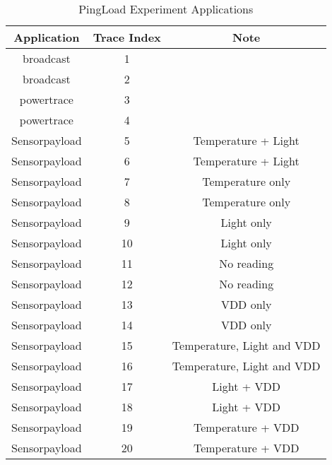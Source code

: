 \begin{table}[!ht]
\center
\begin{tabular}{|c|c|c|}
\hline
\textbf{Application} & \textbf{Trace Index} & \textbf{Note} \\ \hline
broadcast & 1 &  \\ \hline
broadcast & 2 &  \\ \hline
powertrace & 3 &  \\ \hline
powertrace & 4 &  \\ \hline
Sensorpayload & 5 & Temperature + Light \\ \hline
Sensorpayload & 6 & Temperature + Light \\ \hline
Sensorpayload & 7 & Temperature only \\ \hline
Sensorpayload & 8 & Temperature only \\ \hline
Sensorpayload & 9 & Light only \\ \hline
Sensorpayload & 10 & Light only \\ \hline
Sensorpayload & 11 & No reading \\ \hline
Sensorpayload & 12 & No reading \\ \hline
Sensorpayload & 13 & VDD only \\ \hline
Sensorpayload & 14 & VDD only \\ \hline
Sensorpayload & 15 & Temperature, Light and VDD \\ \hline
Sensorpayload & 16 & Temperature, Light and VDD \\ \hline
Sensorpayload & 17 & Light + VDD \\ \hline
Sensorpayload & 18 & Light + VDD \\ \hline
Sensorpayload & 19 & Temperature + VDD \\ \hline
Sensorpayload & 20 & Temperature + VDD \\ \hline
\end{tabular}
\caption{PingLoad Experiment Applications}
\label{PingLoadApps}
\end{table}
